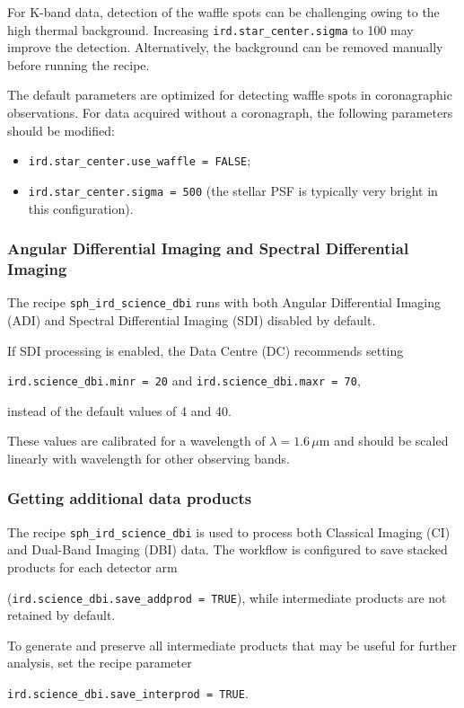 For K-band data, detection of the waffle spots can be challenging owing
to the high thermal background. Increasing
\texttt{ird.star\_center.sigma}
to 100 may improve the detection. Alternatively, the background can be
removed manually before running the recipe.

The default parameters are optimized for detecting waffle spots in
coronagraphic observations. For data acquired without a coronagraph, the
following parameters should be modified:

\begin{itemize}
    \item \texttt{ird.star\_center.use\_waffle = FALSE};
    \item \texttt{ird.star\_center.sigma = 500} (the stellar PSF is
    typically very bright in this configuration).
\end{itemize}

\subsubsection{Angular Differential Imaging and Spectral Differential Imaging}
\label{sec:highcontrast}

The recipe \texttt{sph\_ird\_science\_dbi} runs with both Angular
Differential Imaging (ADI) and Spectral Differential Imaging (SDI)
disabled by default.

If SDI processing is enabled, the Data Centre (DC) recommends setting

\begin{center}
\texttt{ird.science\_dbi.minr = 20}
\qquad
and
\qquad
\texttt{ird.science\_dbi.maxr = 70},
\end{center}

instead of the default values of 4 and 40.

These values are calibrated for a wavelength of
$\lambda = 1.6\,\mu$m and should be scaled linearly with wavelength for
other observing bands.

\subsubsection{Getting additional data products}
\label{sec:img_prod}

The recipe \texttt{sph\_ird\_science\_dbi} is used to process both
Classical Imaging (CI) and Dual-Band Imaging (DBI) data. The workflow is
configured to save stacked products for each detector arm

(\texttt{ird.science\_dbi.save\_addprod = TRUE}), while intermediate
products are not retained by default.

To generate and preserve all intermediate products that may be useful
for further analysis, set the recipe parameter

\begin{center}
\texttt{ird.science\_dbi.save\_interprod = TRUE}.
\end{center}